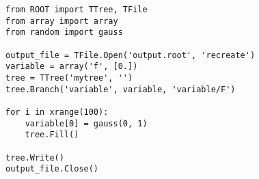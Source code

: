 \begin{footnotesize}
\begin{verbatim}
from ROOT import TTree, TFile
from array import array
from random import gauss

output_file = TFile.Open('output.root', 'recreate')
variable = array('f', [0.])
tree = TTree('mytree', '')
tree.Branch('variable', variable, 'variable/F')

for i in xrange(100):
    variable[0] = gauss(0, 1)
    tree.Fill()

tree.Write()
output_file.Close()
\end{verbatim}
\end{footnotesize}
